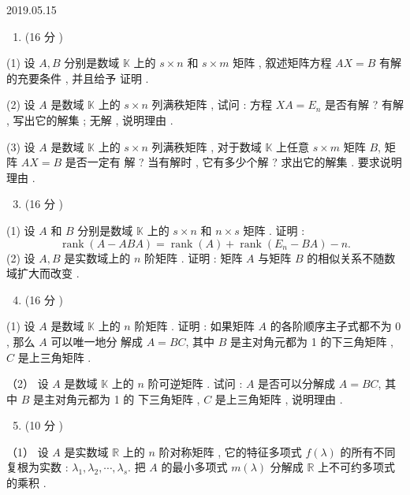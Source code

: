 \documentclass[10pt]{article}
\begin{document}
   

2019.05.15

\begin{enumerate}
  \item (16  分 )
\end{enumerate}
(1)  设  $A, B$  分别是数域  $\mathbb{K}$  上的  $s \times n$  和  $s \times m$  矩阵 ,  叙述矩阵方程  $A X=B$  有解的充要条件 ,  并且给予   证明 .

(2)  设  $A$  是数域  $\mathbb{K}$  上的  $s \times n$  列满秩矩阵 ,  试问 :  方程  $X A=E_{n}$  是否有解 ?  有解 ,  写出它的解集 ;  无解 ,  说明理由 .

(3)  设  $A$  是数域  $\mathbb{K}$  上的  $s \times n$  列满秩矩阵 ,  对于数域  $\mathbb{K}$  上任意  $s \times m$  矩阵  $B$,  矩阵  $A X=B$  是否一定有   解 ?  当有解时 ,  它有多少个解 ?  求出它的解集 .  要求说明理由 .

\begin{enumerate}
  \setcounter{enumi}{2}
  \item (16  分 )
\end{enumerate}
(1)  设  $A$  和  $B$  分别是数域  $\mathbb{K}$  上的  $s \times n$  和  $n \times s$  矩阵 .  证明 :
$$
\operatorname{rank}(A-A B A)=\operatorname{rank}(A)+\operatorname{rank}\left(E_{n}-B A\right)-n .
$$
(2)  设  $A, B$  是实数域上的  $n$  阶矩阵 .  证明 :  矩阵  $A$  与矩阵  $B$  的相似关系不随数域扩大而改变 .

\begin{enumerate}
  \setcounter{enumi}{3}
  \item (16  分 )
\end{enumerate}
(1)  设  $A$  是数域  $\mathbb{K}$  上的  $n$  阶矩阵 .  证明 :  如果矩阵  $A$  的各阶顺序主子式都不为  0 ,  那么  $A$  可以唯一地分   解成  $A=B C$,  其中  $B$  是主对角元都为  1  的下三角矩阵 , $C$  是上三角矩阵 .

（2） 设  $A$  是数域  $\mathbb{K}$  上的  $n$  阶可逆矩阵 .  试问 : $A$  是否可以分解成  $A=B C$,  其中  $B$  是主对角元都为  1  的   下三角矩阵 , $C$  是上三角矩阵 ,  说明理由 .

\begin{enumerate}
  \setcounter{enumi}{4}
  \item (10  分 )
\end{enumerate}
（1） 设  $A$  是实数域  $\mathbb{R}$  上的  $n$  阶对称矩阵 ,  它的特征多项式  $f(\lambda)$  的所有不同复根为实数 : $\lambda_{1}, \lambda_{2}, \cdots, \lambda_{s}$.  把  $A$  的最小多项式  $m(\lambda)$  分解成  $\mathbb{R}$  上不可约多项式的乘积 .
\end{document}
